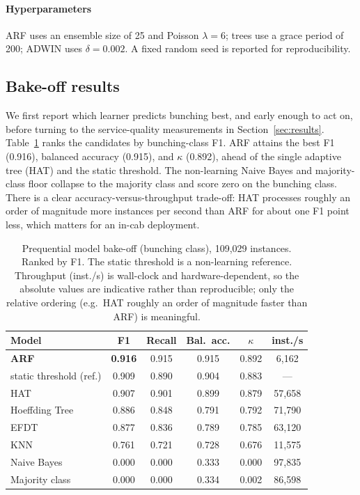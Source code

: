 \documentclass[11pt,a4paper]{article}
\begin{document}
\paragraph{Hyperparameters}
ARF uses an ensemble size of 25 and Poisson $\lambda = 6$; trees use a grace period of 200;
ADWIN uses $\delta = 0.002$. A fixed random seed is reported for reproducibility.

\subsection{Bake-off results}
\label{sec:bakeoff}

We first report which learner predicts bunching best, and early enough to act on, before turning to
the service-quality measurements in Section~\ref{sec:results}. Table~\ref{tab:bakeoff} ranks the
candidates by bunching-class F1. ARF attains the best F1 (0.916), balanced accuracy (0.915), and
$\kappa$ (0.892), ahead of the single adaptive tree (HAT) and the static threshold. The non-learning
Naive Bayes and majority-class floor collapse to the majority class and score zero on the bunching
class. There is a clear accuracy-versus-throughput trade-off: HAT processes roughly an order of
magnitude more instances per second than ARF for about one F1 point less, which matters for an in-cab
deployment.

\begin{table}[t]
\centering
\caption{Prequential model bake-off (bunching class), 109{,}029 instances. Ranked by F1.
The static threshold is a non-learning reference. Throughput (inst./s) is wall-clock and
hardware-dependent, so the absolute values are indicative rather than reproducible; only the
relative ordering (e.g.\ HAT roughly an order of magnitude faster than ARF) is meaningful.}
\label{tab:bakeoff}
\begin{tabular}{lccccc}
\toprule
Model & F1 & Recall & Bal.\ acc. & $\kappa$ & inst./s \\
\midrule
\textbf{ARF}                 & \textbf{0.916} & 0.915 & 0.915 & 0.892 & 6{,}162 \\
static threshold (ref.)      & 0.909 & 0.890 & 0.904 & 0.883 & --- \\
HAT                          & 0.907 & 0.901 & 0.899 & 0.879 & 57{,}658 \\
Hoeffding Tree               & 0.886 & 0.848 & 0.791 & 0.792 & 71{,}790 \\
EFDT                         & 0.877 & 0.836 & 0.789 & 0.785 & 63{,}120 \\
KNN                          & 0.761 & 0.721 & 0.728 & 0.676 & 11{,}575 \\
Naive Bayes                  & 0.000 & 0.000 & 0.333 & 0.000 & 97{,}835 \\
Majority class               & 0.000 & 0.000 & 0.334 & 0.002 & 86{,}598 \\
\bottomrule
\end{tabular}
\end{table}
\end{document}
